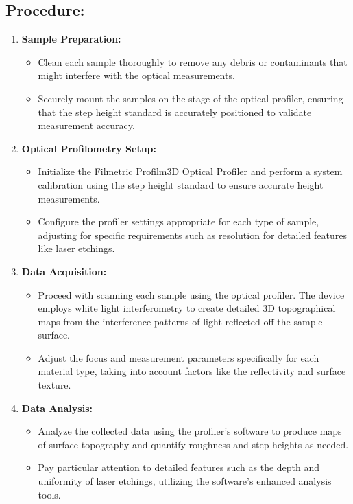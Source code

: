 \documentclass[11pt]{article}
\begin{document}
		\subsection*{Procedure:}
		\begin{enumerate}
			\item \textbf{Sample Preparation:}
			\begin{itemize}
				\item Clean each sample thoroughly to remove any debris or contaminants that might interfere with the optical measurements.
				\item Securely mount the samples on the stage of the optical profiler, ensuring that the step height standard is accurately positioned to validate measurement accuracy.
			\end{itemize}
			
			\item \textbf{Optical Profilometry Setup:}
			\begin{itemize}
				\item Initialize the Filmetric Profilm3D Optical Profiler and perform a system calibration using the step height standard to ensure accurate height measurements.
				\item Configure the profiler settings appropriate for each type of sample, adjusting for specific requirements such as resolution for detailed features like laser etchings.
			\end{itemize}
			
			\item \textbf{Data Acquisition:}
			\begin{itemize}
				\item Proceed with scanning each sample using the optical profiler. The device employs white light interferometry to create detailed 3D topographical maps from the interference patterns of light reflected off the sample surface.
				\item Adjust the focus and measurement parameters specifically for each material type, taking into account factors like the reflectivity and surface texture.
			\end{itemize}
			
			\item \textbf{Data Analysis:}
			\begin{itemize}
				\item Analyze the collected data using the profiler's software to produce maps of surface topography and quantify roughness and step heights as needed.
				\item Pay particular attention to detailed features such as the depth and uniformity of laser etchings, utilizing the software’s enhanced analysis tools.
			\end{itemize}
			

\end{enumerate}
\end{document}
